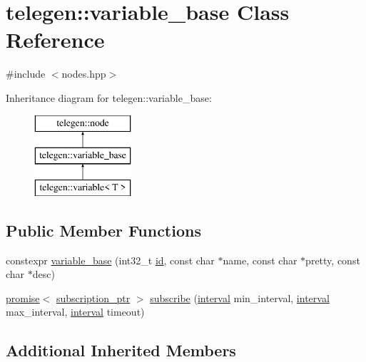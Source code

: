 \hypertarget{classtelegen_1_1variable__base}{}\section{telegen\+:\+:variable\+\_\+base Class Reference}
\label{classtelegen_1_1variable__base}


{\ttfamily \#include $<$nodes.\+hpp$>$}

Inheritance diagram for telegen\+:\+:variable\+\_\+base\+:\begin{figure}[H]
\begin{center}
\leavevmode
\includegraphics[height=3.000000cm]{classtelegen_1_1variable__base}
\end{center}
\end{figure}
\subsection*{Public Member Functions}
\begin{DoxyCompactItemize}
\item 
constexpr \hyperlink{classtelegen_1_1variable__base_a54d7c52810b54d24df2a227d5a1b177d}{variable\+\_\+base} (int32\+\_\+t \hyperlink{classtelegen_1_1node_aae3ff0d12932c55fdc88a1743e27ea56}{id}, const char $\ast$name, const char $\ast$pretty, const char $\ast$desc)
\item 
\hyperlink{namespacetelegen_a9dd802bb5d30cf96b0c616750d43ae86}{promise}$<$ \hyperlink{namespacetelegen_a27c822534a5231fe1c523c81e8768afb}{subscription\+\_\+ptr} $>$ \hyperlink{classtelegen_1_1variable__base_a9ee161bdcfd820aa9dbb750a8140d110}{subscribe} (\hyperlink{namespacetelegen_ad925de2d0a99bc43918533abf0457344}{interval} min\+\_\+interval, \hyperlink{namespacetelegen_ad925de2d0a99bc43918533abf0457344}{interval} max\+\_\+interval, \hyperlink{namespacetelegen_ad925de2d0a99bc43918533abf0457344}{interval} timeout)
\end{DoxyCompactItemize}
\subsection*{Additional Inherited Members}


